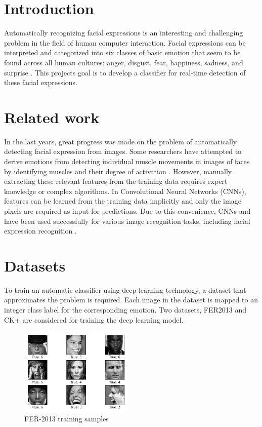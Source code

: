 \documentclass[twoside]{article}
\begin{document}
\begin{multicols}{2} %

\section{Introduction}

Automatically recognizing facial expressions is an interesting and challenging problem in the field of human computer interaction. Facial expressions can be interpreted and categorized into six classes of basic emotion that seem to be found across all human cultures: anger, disgust, fear, happiness, sadness, and surprise \cite{ekman93}. This projects goal is to develop a classifier for real-time detection of these facial expressions.


\section{Related work}
In the last years, great progress was made on the problem of automatically detecting facial expression from images. Some researchers have attempted to derive emotions from detecting individual muscle movements in images of faces by identifying muscles and their degree of activation \cite{lien98}. However, manually extracting these relevant features from the training data requires expert knowledge or complex algorithms. In Convolutional Neural Networks (CNNs), features can be learned from the training data implicitly and only the image pixels are required as input for predictions. Due to this convenience, CNNs and have been used successfully for various image recognition tasks, including facial expression recognition \cite{dumas01}.

\section{Datasets}
To train an automatic classifier using deep learning technology, a dataset that approximates the problem is required. Each image in the dataset is mapped to an integer class label for the corresponding emotion. Two datasets, FER2013 \cite{goodfel13} and CK+ \cite{cohn00} are considered for training the deep learning model.

\begin{figure}[H]
	\includegraphics[width=0.48\textwidth]{fer_examples}
	\caption{FER-2013 training samples}
\end{figure}



\end{multicols}
\end{document}
